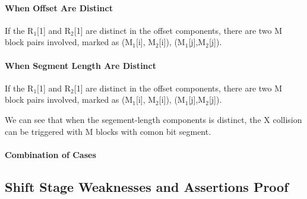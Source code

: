 \documentclass{article}
\begin{document}
\paragraph{When Offset Are Distinct}
If the R$_1$[1] and R$_2$[1] are distinct in the offset components, there are
two M block pairs involved, marked as (M$_1$[i], M$_2$[i]),
(M$_1$[j],M$_2$[j]). 
\paragraph{When Segment Length Are Distinct}
If the R$_1$[1] and R$_2$[1] are distinct in the offset components, there are
two M block pairs involved, marked as (M$_1$[i], M$_2$[i]),
(M$_1$[j],M$_2$[j]). 

We can see that when the segement-length components is distinct, the X collision
can be triggered with M blocks with comon bit segment.
\paragraph{Combination of Cases}


\subsection{Shift Stage Weaknesses and Assertions Proof}
\end{document}
